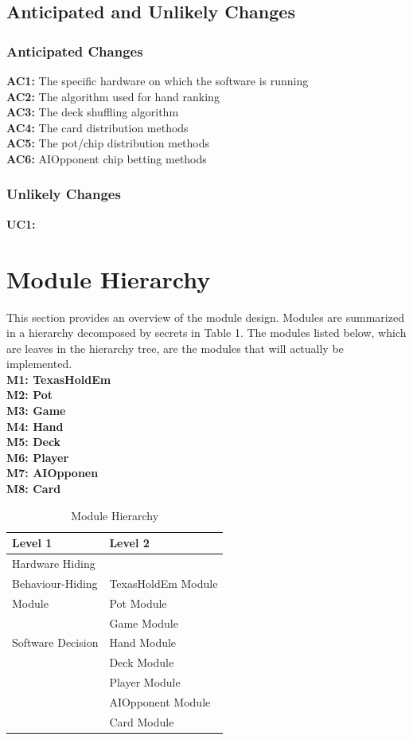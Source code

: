 \documentclass[11pt]{article}
\newcommand{\head}[1]{\textnormal{\textbf{#1}}}
\begin{document}
    \subsection{Anticipated and Unlikely Changes}
    \subsubsection{Anticipated Changes}
    \textbf{AC1:} The specific hardware on which the software is running\\
    \textbf{AC2:} The algorithm used for hand ranking\\
    \textbf{AC3:} The deck shuffling algorithm\\
    \textbf{AC4:} The card distribution methods\\
    \textbf{AC5:} The pot/chip distribution methods\\
    \textbf{AC6:} AIOpponent chip betting methods\\
    
     
    \subsubsection{Unlikely Changes}
    \textbf{UC1:} 
    
    \section{Module Hierarchy}
    This section provides an overview of the module design. Modules are summarized in a hierarchy decomposed by secrets in Table 1. The modules listed below, which are leaves in the hierarchy tree, are the modules that will actually be implemented.\\
    \textbf{M1: TexasHoldEm}\\
    \textbf{M2: Pot}\\
    \textbf{M3: Game}\\
    \textbf{M4: Hand}\\
    \textbf{M5: Deck}\\
    \textbf{M6: Player}\\
    \textbf{M7: AIOpponen}\\
    \textbf{M8: Card}\\
    \begin{table}[h]
    \caption{Module Hierarchy}
    \begin{tabular}{p{4cm}p{5cm}}
    \head{Level 1} & \head{Level 2} \\
    \hline
    Hardware Hiding & \\
    \hline
    Behaviour-Hiding  & TexasHoldEm Module \\
    Module & Pot Module\\
     & Game Module\\
    \hline
    Software Decision & Hand Module  \\
     & Deck Module\\
     & Player Module \\
     & AIOpponent Module\\
     & Card Module\\
    \hline
    \end{tabular}
    \end{table}
	
\end{document}
